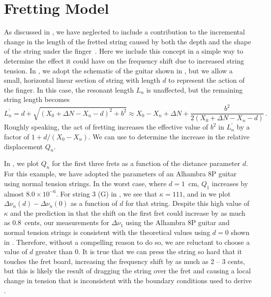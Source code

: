 %
%
%

 \section{Fretting Model\label{app:fret}}

As discussed in , we have neglected to include a contribution to the incremental change in the length of the fretted string caused by both the depth and the shape of the string under the finger~\cite{ref:byers1996cgi,ref:varieschi2010icf}. Here we include this concept in a simple way to determine the effect it could have on the frequency shift due to increased string tension. In , we adopt the schematic of the guitar shown in , but we allow a small, horizontal linear section of string with length $d$ to represent the action of the finger. In this case, the resonant length $L_n$ is unaffected, but the remaining string length becomes
 \begin{equation}
L^\prime_n = d + \sqrt{\left(X_0 + \Delta N - X_n - d\right)^2 + b^2} \approx X_0 - X_n + \Delta N + \frac{b^2}{2 \left(X_0 + \Delta N - X_n - d\right)}\, .
 \end{equation}
Roughly speaking, the act of fretting increases the effective value of $b^2$ in $L^\prime_n$ by a factor of $1 + d / (X_0 - X_n)$. We can use  to determine the increase in the relative displacement $Q_n$.

In , we plot $Q_n$ for the first three frets as a function of the distance parameter $d$. For this example, we have adopted the parameters of an Alhambra 8P guitar using normal tension strings. In the worst case, where $d = 1$~cm, $Q_1$ increases by almost $8.0 \times 10^{-6}$. For string 3 (G) in , we see that $\kappa = 111$, and in  we plot $\Delta \nu_n(d) - \Delta \nu_n(0)$ as a function of $d$ for that string. Despite this high value of $\kappa$ and the prediction in  that the shift on the first fret could increase by as much as 0.8~cents, our measurements for $\Delta \nu_1$ using the Alhambra 8P guitar and normal tension strings is consistent with the theoretical values using $d = 0$ shown in . Therefore, without a compelling reason to do so, we are reluctant to choose a value of $d$ greater than 0. It is true that we can press the string so hard that it touches the fret board, increasing the frequency shift by as much as 2 -- 3 cents, but this is likely the result of dragging the string over the fret and causing a local change in tension that is inconsistent with the boundary conditions used to derive .

